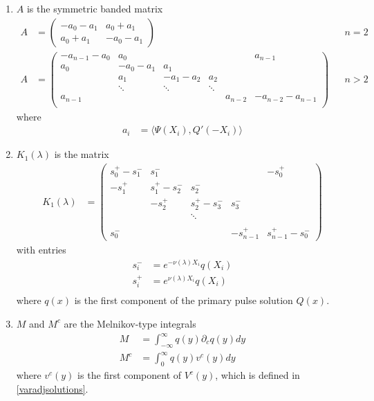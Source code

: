 \documentclass[thesis.tex]{subfiles}
\begin{document}
\begin{theorem}
\begin{enumerate}
\item $A$ is the symmetric banded matrix
\begin{align}\label{Asymm}
A &= \begin{pmatrix}
-a_0 -a_1 & a_0 + a_1 \\
a_0 + a_1 & -a_0 - a_1
\end{pmatrix} && n = 2 \\
A &= \begin{pmatrix}
-a_{n-1} - a_0 & a_0 & & &  & a_{n-1}\\
a_0 & -a_0 - a_1 &  a_1 \\
& a_1 & -a_1 - a_2 &  a_2 \\
& \ddots & \ddots & \ddots \\
a_{n-1} & & & & a_{n-2} & -a_{n-2} - a_{n-1} \\
\end{pmatrix} && n > 2 \nonumber
\end{align}
where
\begin{align*}
a_i &= \langle \Psi(X_i), Q'(-X_i) \rangle
\end{align*}

\item $K_1(\lambda)$ is the matrix
\begin{align*}
K_1(\lambda) &= \begin{pmatrix}
s_0^+ - s_1^- & s_1^- &&& -s_0^+ \\
-s_1^+ & s_1^+ - s_2^- & s_2^- \\
& -s_2^+ & s_2^+ - s_3^- & s_3^- \\ && \ddots \\
\\
s_0^- &&& -s_{n-1}^+ & s_{n-1}^+ - s_0^- 
\end{pmatrix}
\end{align*}
with entries
\begin{align*}
s_i^- &= e^{-\nu(\lambda)X_i} q(X_i)\\
s_i^+ &= e^{\nu(\lambda)X_i} q(X_i)\\
\end{align*}
where $q(x)$ is the first component of the primary pulse solution $Q(x)$. 

\item $M$ and $M^c$ are the Melnikov-type integrals
\begin{align*}
M &= \int_{-\infty}^\infty q(y) \partial_c q(y) dy \\
M^c &= \int_{0}^\infty q(y) v^c(y) dy
\end{align*}
where $v^c(y)$ is the first component of $V^c(y)$, which is defined in \cref{varadjsolutions}.


\end{enumerate}
\end{theorem}
\end{document}
